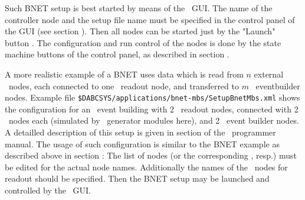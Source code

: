 Such BNET setup is best started by means of the \dabc\ GUI.
The name of the controller  node and
the setup file name must be specified in the control panel of the GUI
(see section ). Then all nodes can be started just by the
"Launch" button . The configuration and run control of the nodes is done by the state machine buttons of the control panel, as described in section .


A more realistic example of a BNET uses data which is read from $n$ external \mbs\ 
nodes, each connected to one \dabc\ readout node, and transferred to
$m$ \dabc\ eventbuilder nodes.
Example file {\tt \$DABCSYS/applications/bnet-mbs/SetupBnetMbs.xml}
shows the configuration for an \mbs\  event building with 2 \dabc\ readout nodes, connected with 2 \mbs\ nodes each (simulated by \dabc\ generator modules here),
and 2 \dabc\ event builder nodes. A detailled description
of this setup is given in section  of the \dabc\
programmer manual.
The usage of such configuration is similar to the BNET example as
described above in section :
The list of \keyw{<Context>} nodes (or the
corresponding \keyw{<Variables>}, resp.) 
must be edited for the actual node names. Additionally the names of the
\mbs\ nodes for readout should be specified. Then the BNET
setup may be launched and controlled by the \dabc\ GUI.










